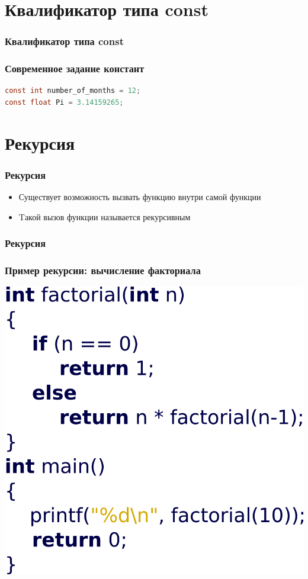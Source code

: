 \documentclass[12pt,pdf,hyperref={unicode}]{beamer}
\begin{document}
\section{Квалификатор типа const}

\begin{frame}[fragile]
\frametitle{Квалификатор типа const} 
\frametitle{Современное задание констант}
\begin{lstlisting}[language=C,basicstyle=\ttfamily,keywordstyle=\color{blue}]
const int number_of_months = 12;
const float Pi = 3.14159265;
\end{lstlisting}
\end{frame}

\fi

\section{Рекурсия}


\begin{frame}[fragile]
\frametitle{Рекурсия} 
\begin{itemize}
\item Существует возможность вызвать функцию внутри самой функции
\item Tакой вызов функции называется рекурсивным
\end{itemize}
\end{frame}

\begin{frame}[fragile]
\frametitle{Рекурсия} 
\frametitle{Пример рекурсии: вычисление факториала} 
\begin{center}
\includegraphics[width=0.65\linewidth]{images/function_recursive.png}
\end{center}
\end{frame}
\end{document}
